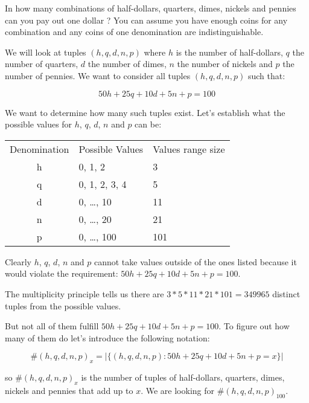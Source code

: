 \vspace{10 mm}
\begin{problem}
In how many combinations of half-dollars, quarters, dimes, nickels and pennies  can you pay out one dollar ? You can assume you have enough coins for any combination and any coins of one denomination are indistinguishable.
\end{problem}

We will look at tuples $(h, q, d, n, p)$ where $h$ is the number of half-dollars, $q$ the number of quarters, $d$ the number of dimes, $n$ the number of nickels and $p$ the number of pennies. We want to consider all tuples $(h, q, d, n, p)$ such that:

\begin{equation*}
50 h + 25 q + 10 d + 5 n + p = 100
\end{equation*} 

We want to determine how many such tuples exist. Let's establish what the possible values for $h$, $q$, $d$, $n$ and $p$ can be:

\begin{center}
  \begin{tabular}{cll}
       Denomination & Possible Values & Values range size\\[5pt]
       h & 0, 1, 2 & 3\\
       q & 0, 1, 2, 3, 4 & 5\\
       d & 0, \ldots, 10 & 11\\
       n & 0, \ldots, 20 & 21\\
       p & 0, \ldots, 100 & 101
    \end{tabular}
\end{center}    

Clearly $h$, $q$, $d$, $n$ and $p$ cannot take values outside of the ones listed because it would violate the requirement: $50 h + 25 q + 10 d + 5 n + p = 100$.

The multiplicity principle tells us there are $3 * 5 * 11 * 21 * 101 =  349965$ distinct tuples from the possible values.

But not all of them fulfill $50 h + 25 q + 10 d + 5 n + p = 100$. To figure out how many of them do let's introduce the following notation:

\begin{equation*}
\#(h, q, d, n, p)_x = | \{(h, q, d, n, p) : 50 h + 25 q + 10 d + 5 n + p = x\} |
\end{equation*} 

so $\#(h, q, d, n, p)_x$ is the number of tuples of half-dollars, quarters, dimes, nickels and pennies that add up to $x$. We are looking for $\#(h, q, d, n, p)_{100}$. 

